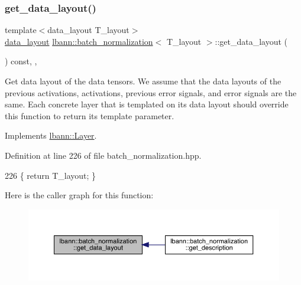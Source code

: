 \subsubsection{\texorpdfstring{get\+\_\+data\+\_\+layout()}{get\_data\_layout()}}
{\footnotesize\ttfamily template$<$data\+\_\+layout T\+\_\+layout$>$ \\
\hyperlink{base_8hpp_a786677cbfb3f5677b4d84f3056eb08db}{data\+\_\+layout} \hyperlink{classlbann_1_1batch__normalization}{lbann\+::batch\+\_\+normalization}$<$ T\+\_\+layout $>$\+::get\+\_\+data\+\_\+layout (\begin{DoxyParamCaption}{ }\end{DoxyParamCaption}) const\hspace{0.3cm}{\ttfamily [inline]}, {\ttfamily [override]}, {\ttfamily [virtual]}}

Get data layout of the data tensors. We assume that the data layouts of the previous activations, activations, previous error signals, and error signals are the same. Each concrete layer that is templated on its data layout should override this function to return its template parameter. 

Implements \hyperlink{classlbann_1_1Layer_a5dfb66e81fc085997402a5e2241316bd}{lbann\+::\+Layer}.



Definition at line 226 of file batch\+\_\+normalization.\+hpp.


\begin{DoxyCode}
226 \{ \textcolor{keywordflow}{return} T\_layout; \}
\end{DoxyCode}
Here is the caller graph for this function\+:\nopagebreak
\begin{figure}[H]
\begin{center}
\leavevmode
\includegraphics[width=350pt]{classlbann_1_1batch__normalization_ac97c038b9dec333a7fb285c196429e2d_icgraph}
\end{center}
\end{figure}
\mbox{\label{classlbann_1_1batch__normalization_a331738f02157f9e1e21f212c41feb86c}} 
